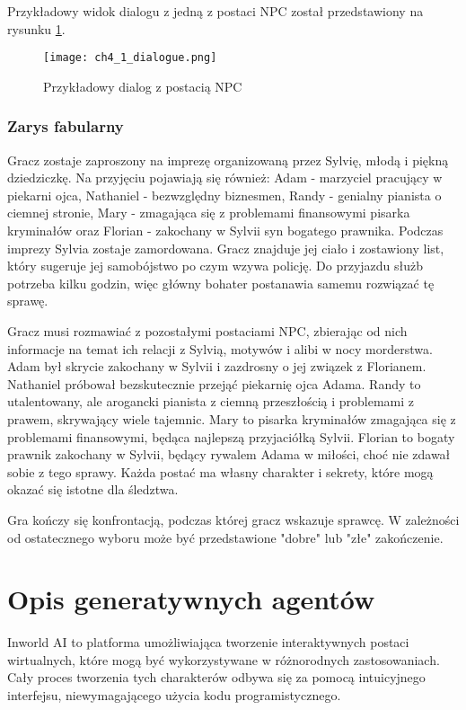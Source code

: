 Przykładowy widok dialogu z jedną z postaci NPC został przedstawiony na rysunku \ref{fig:ch4_1_dialogue}.

\begin{figure}[h!]
    \centering
    \texttt{[image: ch4\_1\_dialogue.png]}
    \caption{Przykładowy dialog z postacią NPC}
    \label{fig:ch4_1_dialogue}
\end{figure}

\subsubsection*{Zarys fabularny}

Gracz zostaje zaproszony na imprezę organizowaną przez Sylvię, młodą i piękną dziedziczkę. Na
przyjęciu pojawiają się również: Adam - marzyciel pracujący w piekarni ojca, Nathaniel -
bezwzględny biznesmen, Randy - genialny pianista o ciemnej stronie, Mary - zmagająca się z
problemami finansowymi pisarka kryminałów oraz Florian - zakochany w Sylvii syn bogatego prawnika.
Podczas imprezy Sylvia zostaje zamordowana. Gracz znajduje jej ciało i zostawiony list, który
sugeruje jej samobójstwo po czym wzywa policję. Do przyjazdu służb potrzeba kilku godzin, więc
główny bohater postanawia samemu rozwiązać tę sprawę.

Gracz musi rozmawiać z pozostałymi postaciami NPC, zbierając od nich informacje na temat ich
relacji z Sylvią, motywów i alibi w nocy morderstwa. Adam był skrycie zakochany w Sylvii i
zazdrosny o jej związek z Florianem. Nathaniel próbował bezskutecznie przejąć piekarnię ojca Adama.
Randy to utalentowany, ale arogancki pianista z ciemną przeszłością i problemami z prawem,
skrywający wiele tajemnic. Mary to pisarka kryminałów zmagająca się z problemami finansowymi,
będąca najlepszą przyjaciółką Sylvii. Florian to bogaty prawnik zakochany w Sylvii, będący rywalem
Adama w miłości, choć nie zdawał sobie z tego sprawy. Każda postać ma własny charakter i sekrety,
które mogą okazać się istotne dla śledztwa.

Gra kończy się konfrontacją, podczas której gracz wskazuje sprawcę.
W zależności od ostatecznego wyboru może być przedstawione "dobre" lub "złe" zakończenie.

\section{Opis generatywnych agentów}\label{section:ch4_2}

Inworld AI to platforma umożliwiająca tworzenie interaktywnych postaci wirtualnych, które mogą być 
wykorzystywane w różnorodnych zastosowaniach. Cały proces tworzenia tych charakterów odbywa się za
pomocą intuicyjnego interfejsu, niewymagającego użycia kodu programistycznego.

